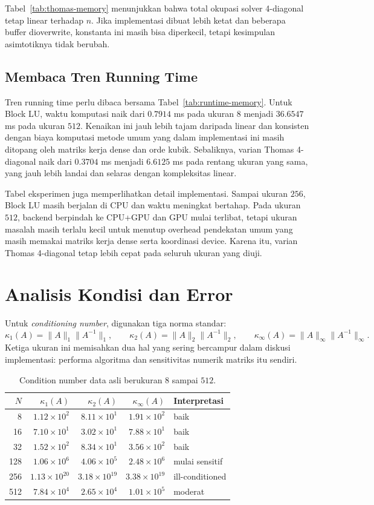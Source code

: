 \documentclass[12pt,a4paper]{article}
\begin{document}
Tabel~\ref{tab:thomas-memory} menunjukkan bahwa total okupasi solver 4-diagonal tetap linear terhadap $n$. Jika implementasi dibuat lebih ketat dan beberapa buffer dioverwrite, konstanta ini masih bisa diperkecil, tetapi kesimpulan asimtotiknya tidak berubah.

\subsection{Membaca Tren Running Time}
Tren running time perlu dibaca bersama Tabel~\ref{tab:runtime-memory}. Untuk Block LU, waktu komputasi naik dari $0.7914$ ms pada ukuran $8$ menjadi $36.6547$ ms pada ukuran $512$. Kenaikan ini jauh lebih tajam daripada linear dan konsisten dengan biaya komputasi metode umum yang dalam implementasi ini masih ditopang oleh matriks kerja dense dan orde kubik. Sebaliknya, varian Thomas 4-diagonal naik dari $0.3704$ ms menjadi $6.6125$ ms pada rentang ukuran yang sama, yang jauh lebih landai dan selaras dengan kompleksitas linear.

Tabel eksperimen juga memperlihatkan detail implementasi. Sampai ukuran $256$, Block LU masih berjalan di CPU dan waktu meningkat bertahap. Pada ukuran $512$, backend berpindah ke CPU+GPU dan GPU mulai terlibat, tetapi ukuran masalah masih terlalu kecil untuk menutup overhead pendekatan umum yang masih memakai matriks kerja dense serta koordinasi device. Karena itu, varian Thomas 4-diagonal tetap lebih cepat pada seluruh ukuran yang diuji.

\section{Analisis Kondisi dan Error}
Untuk \emph{conditioning number}, digunakan tiga norma standar:
\[
\kappa_1(A)=\|A\|_1\|A^{-1}\|_1,\qquad
\kappa_2(A)=\|A\|_2\|A^{-1}\|_2,\qquad
\kappa_\infty(A)=\|A\|_\infty\|A^{-1}\|_\infty.
\]
Ketiga ukuran ini memisahkan dua hal yang sering bercampur dalam diskusi implementasi: performa algoritma dan sensitivitas numerik matriks itu sendiri.

\begin{table}[h]
\centering
\caption{Condition number data asli berukuran $8$ sampai $512$.}
\label{tab:condition-number}
\begin{tabular}{rrrrl}
\toprule
$N$ & $\kappa_1(A)$ & $\kappa_2(A)$ & $\kappa_\infty(A)$ & Interpretasi \\
\midrule
8   & $1.12\times 10^2$  & $8.11\times 10^1$  & $1.91\times 10^2$  & baik \\
16  & $7.10\times 10^1$  & $3.02\times 10^1$  & $7.88\times 10^1$  & baik \\
32  & $1.52\times 10^2$  & $8.34\times 10^1$  & $3.56\times 10^2$  & baik \\
128 & $1.06\times 10^6$  & $4.06\times 10^5$  & $2.48\times 10^6$  & mulai sensitif \\
256 & $1.13\times 10^{20}$ & $3.18\times 10^{19}$ & $3.38\times 10^{19}$ & ill-conditioned \\
512 & $7.84\times 10^4$  & $2.65\times 10^4$  & $1.01\times 10^5$  & moderat \\
\bottomrule
\end{tabular}
\end{table}
\end{document}
